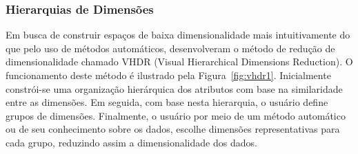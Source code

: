 \subsubsection{Hierarquias de Dimensões}

Em busca de construir espaços de baixa dimensionalidade mais intuitivamente do que pelo uso de métodos automáticos, \cite{Yang2003} desenvolveram o método de redução de dimensionalidade chamado VHDR (Visual Hierarchical Dimensions Reduction). O funcionamento deste método é ilustrado pela Figura~\ref{fig:vhdr1}. Inicialmente constrói-se uma organização hierárquica dos atributos com base na similaridade entre as dimensões. Em seguida, com base nesta hierarquia, o usuário define grupos de dimensões. Finalmente, o usuário por meio de um método automático ou de seu conhecimento sobre os dados, escolhe dimensões representativas para cada grupo, reduzindo assim a dimensionalidade dos dados. 

